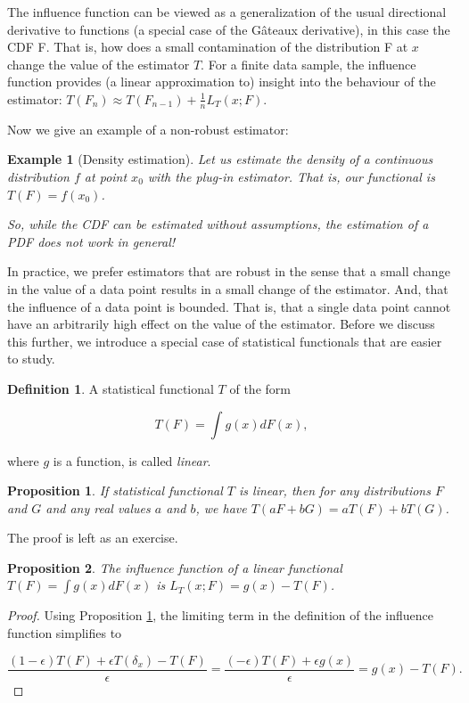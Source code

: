 \documentclass{book}
\theoremstyle{plain}%
\newtheorem{prototheorem}{Example}[section]
\newenvironment{cexample}
   {\colorlet{shadecolor}{gray!10}\begin{shaded}\begin{prototheorem}}
   {\end{prototheorem}\end{shaded}}
\newtheorem{proposition}{Proposition}[section]
\theoremstyle{definition}
\newtheorem{definition}{Definition}[section]
\begin{document}
The influence function can be viewed as a generalization of the usual directional derivative to functions (a special case of the G\^{a}teaux derivative), in this case the CDF F. That is, how does a small contamination of the distribution F at $x$ change the value of the estimator $T$. For a finite data sample, the influence function provides (a linear approximation to) insight into the behaviour of the estimator: $T(F_n) \approx T(F_{n-1}) + \frac{1}{n}L_T(x;F)$.

Now we give an example of a non-robust estimator:

\begin{cexample}[Density estimation] Let us estimate the density of a continuous distribution $f$ at point $x_0$ with the plug-in estimator. That is, our functional is $T(F) = f(x_0)$.

So, while the CDF can be estimated without assumptions, the estimation of a PDF does not work in general!
\end{cexample}

In practice, we prefer estimators that are robust in the sense that a small change in the value of a data point results in a small change of the estimator. And, that the influence of a data point is bounded. That is, that a single data point cannot have an arbitrarily high effect on the value of the estimator. Before we discuss this further, we introduce a special case of statistical functionals that are easier to study.


\begin{definition} A statistical functional $T$ of the form

$$T(F) = \int g(x)dF(x),$$

where $g$ is a function, is called \emph{linear}.
\end{definition}

\begin{proposition}
If statistical functional $T$ is linear, then for any distributions $F$ and $G$ and any real values $a$ and $b$, we have $T(aF + bG) = aT(F) + bT(G)$.\label{prop:lin_func}
\end{proposition}

The proof is left as an exercise.

\begin{proposition}
The influence function of a linear functional $T(F) = \int g(x)dF(x)$ is $L_T(x; F) = g(x) - T(F)$.
\end{proposition}

\begin{proof}
Using Proposition \ref{prop:lin_func}, the limiting term in the definition of the influence function simplifies to 

$$\frac{(1 - \epsilon)T(F) + \epsilon T(\delta_x) - T(F)}{\epsilon} = \frac{(- \epsilon)T(F) + \epsilon g(x)}{\epsilon} = g(x) - T(F).$$
\end{proof}
\end{document}
